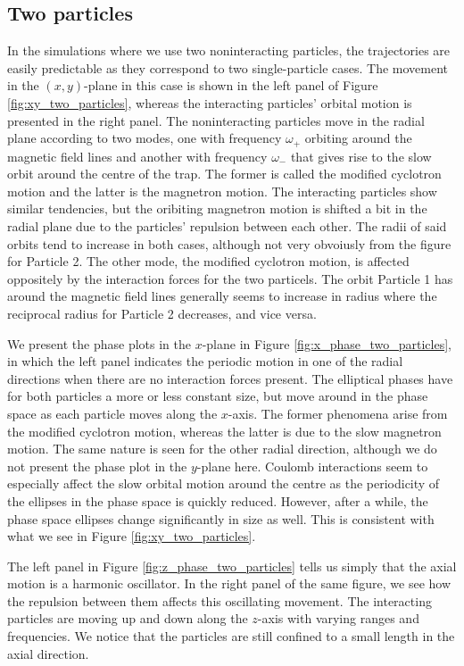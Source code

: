 \subsection{Two particles}


In the simulations where we use two noninteracting particles, the trajectories are easily predictable as they correspond to two single-particle cases. The movement in the $(x,y)$-plane in this case is shown in the left panel of Figure \ref{fig:xy_two_particles}, whereas the interacting particles' orbital motion is presented in the right panel. The noninteracting particles move in the radial plane according to two modes, one with frequency $\omega_+$ orbiting around the magnetic field lines and another with frequency $\omega_-$ that gives rise to the slow orbit around the centre of the trap. The former is called the modified cyclotron motion and the latter is the magnetron motion. The interacting particles show similar tendencies, but the oribiting magnetron motion is shifted a bit in the radial plane due to the particles' repulsion between each other. The radii of said orbits tend to increase in both cases, although not very obvoiusly from the figure for Particle 2. The other mode, the modified cyclotron motion, is affected oppositely by the interaction forces for the two particels. The orbit Particle 1 has around the magnetic field lines generally seems to increase in radius where the reciprocal radius for Particle 2 decreases, and vice versa.

We present the phase plots in the $x$-plane in Figure \ref{fig:x_phase_two_particles}, in which the left panel indicates the periodic motion in one of the radial directions when there are no interaction forces present. The elliptical phases have for both particles a more or less constant size, but move around in the phase space as each particle moves along the $x$-axis. The former phenomena arise from the modified cyclotron motion, whereas the latter is due to the slow magnetron motion. The same nature is seen for the other radial direction, although we do not present the phase plot in the $y$-plane here. Coulomb interactions seem to especially affect the slow orbital motion around the centre as the periodicity of the ellipses in the phase space is quickly reduced. However, after a while, the phase space ellipses change significantly in size as well. This is consistent with what we see in Figure \ref{fig:xy_two_particles}.  

The left panel in Figure \ref{fig:z_phase_two_particles} tells us simply that the axial motion is a harmonic oscillator. In the right panel of the same figure, we see how the repulsion between them affects this oscillating movement. The interacting particles are moving up and down along the $z$-axis with varying ranges and frequencies. We notice that the particles are still confined to a small length in the axial direction. 

